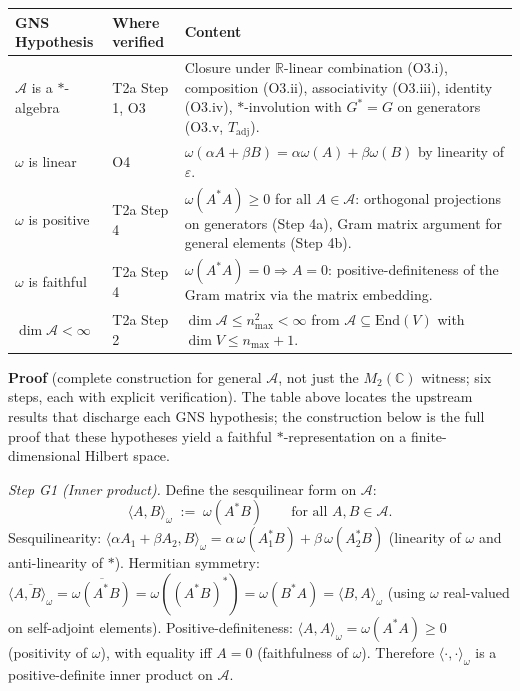 \documentclass[11pt]{article}
\theoremstyle{remark}
\begin{document}
\begin{tcolorbox}[apfbox, title={Theorem $T_{\mathrm{GNS}}$ (GNS Construction: General Case)}]
\smallskip
\begin{tabular}{@{}p{3.6cm}p{2.4cm}p{6.4cm}@{}}
\textbf{GNS Hypothesis} & \textbf{Where verified} & \textbf{Content} \\[2pt]
\hline\noalign{\smallskip}
$\mathcal{A}$ is a $*$-algebra & T2a Step 1, O3 & Closure under $\mathbb{R}$-linear combination (O3.i), composition (O3.ii), associativity (O3.iii), identity (O3.iv), $*$-involution with $G^* = G$ on generators (O3.v, $T_{\mathrm{adj}}$). \\[4pt]
$\omega$ is linear & O4 & $\omega(\alpha A + \beta B) = \alpha\omega(A) + \beta\omega(B)$ by linearity of $\varepsilon$. \\[4pt]
$\omega$ is positive & T2a Step 4 & $\omega(A^*A) \ge 0$ for all $A \in \mathcal{A}$: orthogonal projections on generators (Step 4a), Gram matrix argument for general elements (Step 4b). \\[4pt]
$\omega$ is faithful & T2a Step 4 & $\omega(A^*A) = 0 \Rightarrow A = 0$: positive-definiteness of the Gram matrix via the matrix embedding. \\[4pt]
$\dim \mathcal{A} < \infty$ & T2a Step 2 & $\dim \mathcal{A} \le n_{\max}^2 < \infty$ from $\mathcal{A} \subseteq \mathrm{End}(V)$ with $\dim V \le n_{\max} + 1$. \\
\end{tabular}

\smallskip\noindent\textbf{Proof} (complete construction for general $\mathcal{A}$, not just the $M_2(\mathbb{C})$ witness; six steps, each with explicit verification).  The table above locates the upstream results that discharge each GNS hypothesis; the construction below is the full proof that these hypotheses yield a faithful $*$-representation on a finite-dimensional Hilbert space.

\textit{Step G1 (Inner product).}  Define the sesquilinear form on $\mathcal{A}$:
\[
\langle A, B \rangle_\omega \;:=\; \omega(A^* B) \qquad \text{for all } A, B \in \mathcal{A}.
\]
Sesquilinearity: $\langle \alpha A_1 + \beta A_2, B \rangle_\omega = \alpha\, \omega(A_1^* B) + \beta\, \omega(A_2^* B)$ (linearity of $\omega$ and anti-linearity of $*$).  Hermitian symmetry: $\overline{\langle A, B \rangle_\omega} = \overline{\omega(A^*B)} = \omega((A^*B)^*) = \omega(B^*A) = \langle B, A \rangle_\omega$ (using $\omega$ real-valued on self-adjoint elements).  Positive-definiteness: $\langle A, A \rangle_\omega = \omega(A^*A) \ge 0$ (positivity of $\omega$), with equality iff $A = 0$ (faithfulness of $\omega$).  Therefore $\langle \cdot, \cdot \rangle_\omega$ is a positive-definite inner product on $\mathcal{A}$.


\end{tcolorbox}
\end{document}
